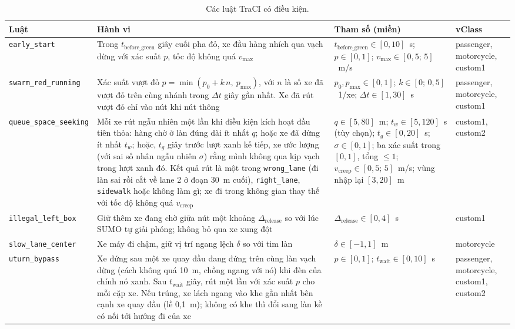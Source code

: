 \documentclass[../main.tex]{subfiles}
\begin{document}
\begin{table}[ht]
\centering
\small
\caption{Các luật TraCI có điều kiện.}
\label{table:3.2}
\begin{tabular}{|p{2.6cm}|p{5.2cm}|p{3.3cm}|p{2.1cm}|}
\hline
\textbf{Luật} & \textbf{Hành vi} & \textbf{Tham số (miền)} & \textbf{vClass} \\ \hline
\texttt{early\_\allowbreak start} & Trong $t_{\text{before\_green}}$ giây cuối pha đỏ, xe đầu hàng nhích qua vạch dừng với xác suất $p$, tốc độ không quá $v_{\max}$ & $t_{\text{before\_green}} \in [0,10]$~s; $p \in [0,1]$; $v_{\max} \in [0{,}5;\,5]$~m/s & passenger, motorcycle, custom1 \\ \hline
\texttt{swarm\_\allowbreak red\_\allowbreak running} & Xác suất vượt đỏ $p = \min(p_0 + k\,n,\ p_{\max})$, với $n$ là số xe đã vượt đỏ trên cùng nhánh trong $\Delta t$ giây gần nhất. Xe đã rút vượt đỏ chỉ vào nút khi nút thông & $p_0, p_{\max} \in [0,1]$; $k \in [0;\,0{,}5]$~1/xe; $\Delta t \in [1,30]$~s & passenger, motorcycle, custom1 \\ \hline
\texttt{queue\_\allowbreak space\_\allowbreak seeking} & Mỗi xe rút ngẫu nhiên một lần khi điều kiện kích hoạt đầu tiên thỏa: hàng chờ ở làn đúng dài ít nhất $q$; hoặc xe đã dừng ít nhất $t_w$; hoặc, $t_{g}$ giây trước lượt xanh kế tiếp, xe ước lượng (với sai số nhân ngẫu nhiên $\sigma$) rằng mình không qua kịp vạch trong lượt xanh đó. Kết quả rút là một trong \texttt{wrong\_lane} (đi làn sai rồi cắt về lane 2 ở đoạn 30~m cuối), \texttt{right\_lane}, \texttt{sidewalk} hoặc không làm gì; xe đi trong không gian thay thế với tốc độ không quá $v_{\text{creep}}$ & $q \in [5,80]$~m; $t_w \in [5,120]$~s (tùy chọn); $t_{g} \in [0,20]$~s; $\sigma \in [0,1]$; ba xác suất trong $[0,1]$, tổng $\le 1$; $v_{\text{creep}} \in [0{,}5;\,5]$~m/s; vùng nhập lại $[3,20]$~m & custom1, custom2 \\ \hline
\texttt{illegal\_\allowbreak left\_\allowbreak box} & Giữ thêm xe đang chờ giữa nút một khoảng $\Delta_{\text{release}}$ so với lúc SUMO tự giải phóng; không bỏ qua xe xung đột & $\Delta_{\text{release}} \in [0,4]$~s & custom1 \\ \hline
\texttt{slow\_\allowbreak lane\_\allowbreak center} & Xe máy đi chậm, giữ vị trí ngang lệch $\delta$ so với tim làn & $\delta \in [-1,1]$~m & motorcycle \\ \hline
\texttt{uturn\_\allowbreak bypass} & Xe đứng sau một xe quay đầu đang đứng trên cùng làn vạch dừng (cách không quá 10~m, chồng ngang với nó) khi đèn của chính nó xanh. Sau $t_{\text{wait}}$ giây, rút một lần với xác suất $p$ cho mỗi cặp xe. Nếu trúng, xe lách ngang vào khe gần nhất bên cạnh xe quay đầu (lề 0,1~m); không có khe thì đổi sang làn kề có nối tới hướng đi của xe & $p \in [0,1]$; $t_{\text{wait}} \in [0,10]$~s & passenger, motorcycle, custom1, custom2 \\ \hline
\end{tabular}
\end{table}
\end{document}
